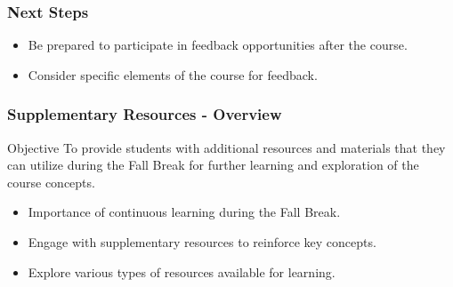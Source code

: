 \documentclass[aspectratio=169]{beamer}
\begin{document}
\begin{frame}[fragile]
    \frametitle{Next Steps}
    
    \begin{itemize}
        \item Be prepared to participate in feedback opportunities after the course.
        \item Consider specific elements of the course for feedback.
    \end{itemize}
\end{frame}

\begin{frame}[fragile]
    \frametitle{Supplementary Resources - Overview}
    \begin{block}{Objective}
        To provide students with additional resources and materials that they can utilize during the Fall Break for further learning and exploration of the course concepts.
    \end{block}
    
    \begin{itemize}
        \item Importance of continuous learning during the Fall Break.
        \item Engage with supplementary resources to reinforce key concepts.
        \item Explore various types of resources available for learning.
    \end{itemize}
\end{frame}
\end{document}
